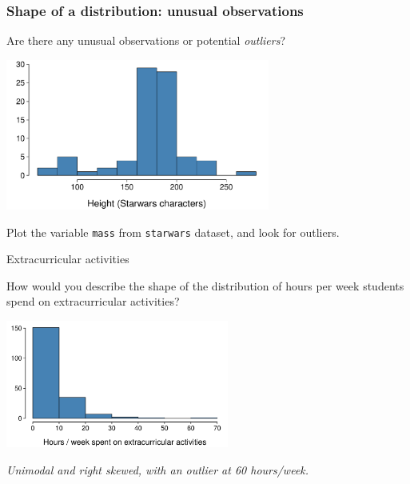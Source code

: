 \documentclass[notes,11pt, aspectratio=169]{beamer}
\newcommand{\hl}[1]{\textit{\textcolor{hlblue}{#1}}}
\newcommand{\dq}[1]{
\begin{beamerboxesrounded}[shadow = false, lower = disc ques body]{}
#1
\end{beamerboxesrounded}
}
\begin{document}
\begin{frame}
\frametitle{Shape of a distribution: unusual observations}

Are there any unusual observations or potential \hl{outliers}?

\begin{center}
\includegraphics[width=0.65\textwidth]{graphs/l02f08.pdf}
\end{center}

\pause 

Plot the variable \texttt{mass} from \texttt{starwars} dataset, and look for outliers.
\end{frame}


\begin{frame}{Extracurricular activities}

\dq{How would you describe the shape of the distribution of hours per week students spend on extracurricular activities?}

\begin{center}
\includegraphics[width=0.55\textwidth]{graphs/l02f09.pdf}
\end{center}

\pause
\colorbox{textboxgreen!75}{\textit{Unimodal and right skewed, with an outlier at 60 hours/week.}}

\end{frame}
\end{document}
